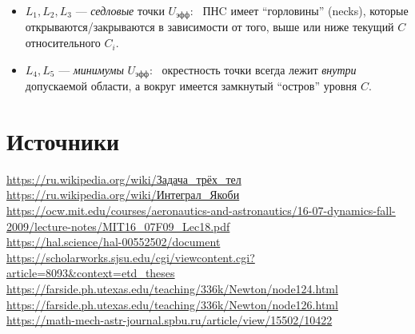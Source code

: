 \documentclass[12pt]{article}
\begin{document}
\begin{itemize}
  \item $L_1,L_2,L_3$ --- \emph{седловые} точки $U_{\mathrm{эфф}}$: \
        ПНC имеет ``горловины'' (necks), которые открываются/закрываются
        в зависимости от того, выше или ниже текущий $C$ относительного $C_i$.
  \item $L_4,L_5$ --- \emph{минимумы} $U_{\mathrm{эфф}}$: \
        окрестность точки всегда лежит {\it внутри} допускаемой области,
        а вокруг имеется замкнутый ``остров'' уровня $C$.
\end{itemize}

\section{Источники}

\url{https://ru.wikipedia.org/wiki/Задача_трёх_тел}\\
\url{https://ru.wikipedia.org/wiki/Интеграл_Якоби}\\
\url{https://ocw.mit.edu/courses/aeronautics-and-astronautics/16-07-dynamics-fall-2009/lecture-notes/MIT16_07F09_Lec18.pdf}\\
\url{https://hal.science/hal-00552502/document}\\
\url{https://scholarworks.sjsu.edu/cgi/viewcontent.cgi?article=8093&context=etd_theses}\\
\url{https://farside.ph.utexas.edu/teaching/336k/Newton/node124.html}\\
\url{https://farside.ph.utexas.edu/teaching/336k/Newton/node126.html}\\
\url{https://math-mech-astr-journal.spbu.ru/article/view/15502/10422}\\
\end{document}
